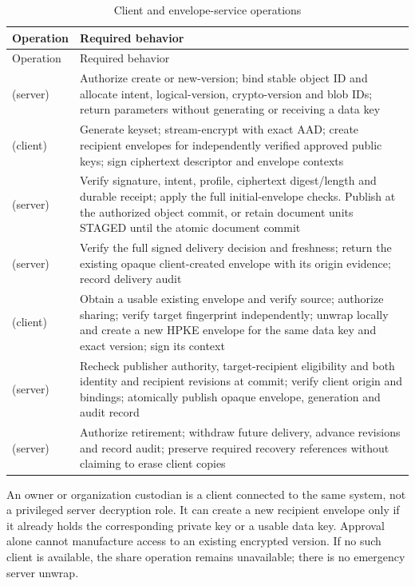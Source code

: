 \begin{longtable}{@{}P{0.29\textwidth}P{0.61\textwidth}@{}}
\caption{Client and envelope-service operations}\label{tab:broker}\\
\toprule Operation & Required behavior\\\midrule\endfirsthead
\toprule Operation & Required behavior\\\midrule\endhead
{} (server) & Authorize create or new-version; bind stable object ID and allocate intent, logical-version, crypto-version and blob IDs; return parameters without generating or receiving a data key\\
 (client) & Generate keyset; stream-encrypt with exact AAD; create recipient envelopes for independently verified approved public keys; sign ciphertext descriptor and envelope contexts\\
 (server) & Verify signature, intent, profile, ciphertext digest/length and durable receipt; apply the full initial-envelope checks. Publish at the authorized object commit, or retain document units STAGED until the atomic document commit\\
 (server) & Verify the full signed delivery decision and freshness; return the existing opaque client-created envelope with its origin evidence; record delivery audit\\
 (client) & Obtain a usable existing envelope and verify source; authorize sharing; verify target fingerprint independently; unwrap locally and create a new HPKE envelope for the same data key and exact version; sign its context\\
 (server) & Recheck publisher authority, target-recipient eligibility and both identity and recipient revisions at commit; verify client origin and bindings; atomically publish opaque envelope, generation and audit record\\
 (server) & Authorize retirement; withdraw future delivery, advance revisions and record audit; preserve required recovery references without claiming to erase client copies\\
\bottomrule
\end{longtable}

An owner or organization custodian is a client connected to the same system, not a privileged server decryption role. It can create a new recipient envelope only if it already holds the corresponding private key or a usable data key. Approval alone cannot manufacture access to an existing encrypted version. If no such client is available, the share operation remains unavailable; there is no emergency server unwrap.

